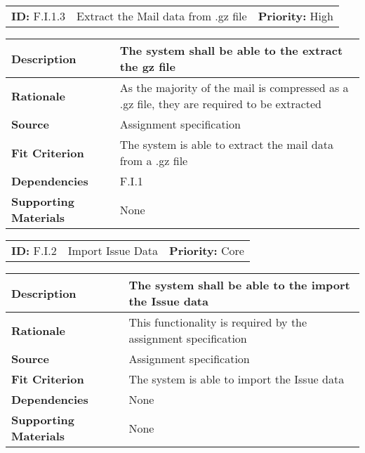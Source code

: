 \begin{table}[H]
    \begin{tabularx}{\textwidth}{| l | X | l |}
        \hline
        \textbf{ID:} F.I.1.3 & Extract the Mail data from .gz file & \textbf{Priority:} High \\
    \end{tabularx}
    \begin{tabularx}{\textwidth}{| l | X |}
        \hline
        \textbf{Description} & The system shall be able to the extract the gz file\\ \hline
        \textbf{Rationale} & As the majority of the mail is compressed as a .gz file, they are required to be extracted\\ \hline
        \textbf{Source} & Assignment specification\\ \hline
        \textbf{Fit Criterion} & The system is able to extract the mail data from a .gz file\\ \hline
        \textbf{Dependencies} & F.I.1 \\ \hline
        \textbf{Supporting Materials} & None \\ \hline
    \end{tabularx}
\end{table}

\begin{table}[H]
    \begin{tabularx}{\textwidth}{| l | X | l |}
        \hline
        \textbf{ID:} F.I.2 & Import Issue Data & \textbf{Priority:} Core \\
    \end{tabularx}
    \begin{tabularx}{\textwidth}{| l | X |}
        \hline
        \textbf{Description} & The system shall be able to the import the Issue data \\ \hline
        \textbf{Rationale} & This functionality is required by the assignment specification\\ \hline
        \textbf{Source} & Assignment specification\\ \hline
        \textbf{Fit Criterion} & The system is able to import the Issue data\\ \hline
        \textbf{Dependencies} & None \\ \hline
        \textbf{Supporting Materials} & None \\ \hline
    \end{tabularx}
\end{table}

